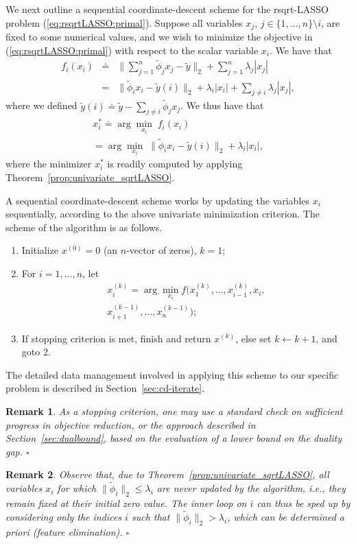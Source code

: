 \documentclass[11pt]{article}
\newcommand{\qed}{{\hfill $\square$}}
\newcommand{\lam}{\lambda}
\newcommand{\beas}{\begin{eqnarray*}}
\newcommand{\eeas}{\end{eqnarray*}}
\newcommand{\ben}{\begin{enumerate}}
\newcommand{\een}{\end{enumerate}}
\newtheorem{remark}{Remark}
\begin{document}
We next outline a sequential coordinate-descent scheme for the rsqrt-LASSO problem (\ref{eq:rsqrtLASSO:primal}).
Suppose all variables $x_j$, $j\in\{1,\ldots,n\}\setminus i$, are fixed to some numerical values, and we wish
to minimize the objective in (\ref{eq:rsqrtLASSO:primal}) with respect to the scalar variable $x_i$. We have that
\beas
f_i(x_i) &\doteq & \|\sum_{j=1}^n 
\tilde  \phi_j  x_j - 
\tilde y\|_2 + \sum_{j=1}^n \lam_j|x_j| \\
&=& 
 \|\tilde \phi_i x_i - 
\tilde y(i) \|_2 + \lam_i|x_i| + \sum_{j\neq i} \lam_j|x_j|,
\eeas
where we defined 
$
\tilde y(i) \doteq \tilde y - \sum_{j\neq i} \tilde \phi_j x_j
$.
We thus have that
\[
\begin{array}{l}
x_i^* \doteq \arg \min_{x_i} \; f_i(x_i) \\ = \arg \min_{x_i} \;  \|\tilde \phi_i x_i - 
\tilde y(i) \|_2 + \lam_i|x_i| ,
\end{array}
\]
where  the minimizer $x_i^*$ is readily computed by applying Theorem~\ref{prop:univariate_sqrtLASSO}.

A
 sequential coordinate-descent scheme  works by updating the variables $x_i$ sequentially, according to
the above univariate minimization criterion. The scheme of the algorithm is as follows.
\ben
\item Initialize $x^{(0)} = 0$ (an $n$-vector of zeros), $k=1$;
\item For $i=1,\ldots,n$, let
\[
\begin{array}{r}
x^{(k)}_i = \arg\min_{x_i} f(x_1^{(k)},\ldots,x_{i-1}^{(k)},x_i, \\ x_{i+1}^{(k-1)},\ldots, x_{n}^{(k-1)}) ;
\end{array}
\]
\item If stopping criterion is met, finish and return $x^{(k)}$, else set $k\gets k+1$, and goto 2.
\een
The detailed data management involved in applying this scheme to our specific problem is described in Section~\ref{sec:cd-iterate}.

\begin{remark}\rm 
As a stopping criterion, one may use a standard check on sufficient progress in objective reduction, or the approach described in Section~\ref{sec:dualbound}, based on the evaluation of a lower bound on the duality gap. \qed
\end{remark}

\begin{remark}\rm 
Observe that, due to Theorem~\ref{prop:univariate_sqrtLASSO}, all variables $x_i$ for which
$\|\tilde \phi_i\|_2  \leq \lam_i$ are {\em never} updated by the algorithm, i.e., they remain fixed at their initial zero value.
The inner loop on $i$ can thus be sped up by considering only the indices $i$ such that
$\|\tilde \phi_i\|_2 > \lam_i$, which can be determined a priori (feature elimination). \qed
\end{remark}
\end{document}
